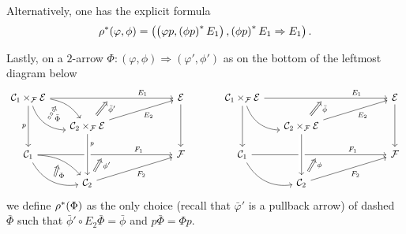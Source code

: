 \documentclass[a4paper,10pt
,draft
]{article}%
\numberwithin{equation}{section}
\numberwithin{figure}{section}
\theoremstyle{definition} %
\newcommand{\1}{\ensuremath{\mathbbm 1}}%
\begin{document}
Alternatively, one has the explicit formula
\[
\rho^{\**} (\varphi,\phi)=
\left(
\left( \varphi p,
\left( \phi p \right)^{\**} E_1 \right),
\left( \phi p \right)^{\**} E_1 \Rightarrow E_1
\right).
\]



Lastly, on a $2$-arrow $\Phi \colon (\varphi,\phi) \Rightarrow (\varphi',\phi')$
as on the bottom of the leftmost diagram below
\begin{equation}\label{PULL2ARR EQ}
\begin{tikzcd}[column sep = 16pt, row sep = 13pt]
\mathcal{C}_1 \times_{\mathcal{F}} \mathcal{E} 
\ar{rrrrr}[name=toE]{}[near end]{E_1} 
\ar[bend left=23]{rd}[near start, swap, name=FE]{}
\ar[bend right=35]{rd}[name=FFE]{} \ar{dd}[swap]{p}
&&&
&&
\mathcal{E}  \ar{dd}
&&
\mathcal{C}_1 \times_{\mathcal{F}} \mathcal{E} 
\ar{rrrrr}[name=toE2]{}[near end]{E_1} 
\ar[bend right=35]{rd}{} \ar{dd}
&&&
&&
\mathcal{E}  \ar{dd}
\\
&
|[alias=DBE]|
\mathcal{C}_2 \times_{\mathcal{F}} \mathcal{E} \ar{rrrru}[swap]{E_2}
\ar{dd}[near start]{p} &&&&
&&
&
|[alias=DBE2]|
\mathcal{C}_2 \times_{\mathcal{F}} \mathcal{E} \ar{rrrru}[swap]{E_2} &&&&
\\
\mathcal{C}_1 \ar{rrrrr}[name=toB]{}[near end]{F_1} 
\ar[bend left=23]{rd}[swap,name=FF]{}
\ar[bend right=35]{rd} [name=F]{}
&&&
&&
\mathcal{F} 
&&
\mathcal{C}_1 \ar{rrrrr}[name=toB2]{}[near end]{F_1} 
\ar[bend right=35]{rd}{}
&&&
&&
\mathcal{F} 
\\
&
|[alias=D]| \mathcal{C}_2 \ar{rrrru}[swap]{F_2} &&&&
&&
&
|[alias=D2]|
\mathcal{C}_2 \ar{rrrru}[swap]{F_2} &&&&
\arrow[Rightarrow, from=DBE, to=toE, shorten <=0.15cm,shorten >=0.15cm
,swap,near end,"\bar{\phi}'"
]
\arrow[Rightarrow, from=DBE2, to=toE2, shorten <=0.15cm,shorten >=0.15cm
,swap,near end,"\bar{\phi}"
]
\arrow[Rightarrow, from=D, to=toB, shorten <=0.15cm,shorten >=0.15cm,swap,near end,"\phi'"]
\arrow[Rightarrow, from=D2, to=toB2, shorten <=0.15cm,shorten >=0.15cm,swap,near end,"\phi"]
\arrow[Rightarrow, from=F, to=FF, shorten <=0cm,shorten >=0cm,swap,"\Phi"]
\arrow[Rightarrow, from=FFE, to=FE, shorten <=0cm,shorten >=0cm,swap,dashed,"\bar{\Phi}"]
\arrow[from=DBE, to=D, crossing over]
\arrow[from=DBE2, to=D2, crossing over]
\end{tikzcd}
\end{equation}
we define $\rho^{\**}(\Phi)$
as the only choice (recall that $\bar{\varphi}'$ is a pullback arrow)
of dashed $\bar{\Phi}$
such that $\bar{\phi}' \circ E_2\bar{\Phi} = \bar{\phi}$
and $p \bar{\Phi} = \Phi p$.
\end{document}

